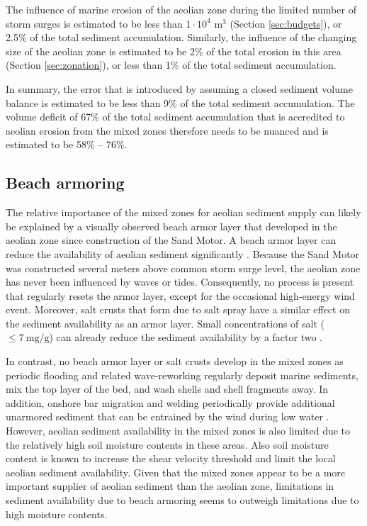 The influence of marine erosion of the aeolian zone during the limited
number of storm surges is estimated to be less than
$\mathrm{1 \cdot 10^4}$ $\mathrm{m^3}$ (Section \ref{sec:budgets}), or
2.5\% of the total sediment accumulation. Similarly, the influence of
the changing size of the aeolian zone is estimated to be 2\% of the
total erosion in this area (Section \ref{sec:zonation}), or less than
1\% of the total sediment accumulation.

In summary, the error that is introduced by assuming a closed sediment
volume balance is estimated to be less than 9\% of the total sediment
accumulation. The volume deficit of 67\% of the total sediment
accumulation that is accredited to aeolian erosion from the mixed
zones therefore needs to be nuanced and is estimated to be 58\% --
76\%.

\subsection{Beach armoring}

The relative importance of the mixed zones for aeolian sediment supply
can likely be explained by a visually observed beach armor layer that
developed in the aeolian zone since construction of the Sand Motor. A
beach armor layer can reduce the availability of aeolian sediment
significantly \citep{McKennaNeuman2012}. Because the Sand Motor was
constructed several meters above common storm surge level, the aeolian
zone has never been influenced by waves or tides. Consequently, no
process is present that regularly resets the armor layer, except for
the occasional high-energy wind event. Moreover, salt crusts that form
due to salt spray have a similar effect on the sediment availability
as an armor layer. Small concentrations of salt
($\mathrm{\leq 7 ~ mg/g}$) can already reduce the sediment
availability by a factor two \citep{Nickling1981}. 

In contrast, no beach armor layer or salt crusts develop in the mixed
zones as periodic flooding and related wave-reworking regularly
deposit marine sediments, mix the top layer of the bed, and wash
shells and shell fragments away. In addition, onshore bar migration
and welding periodically provide additional unarmored sediment that
can be entrained by the wind during low water \citep{Houser2009,
  Anthony2013}. However, aeolian sediment availability in the mixed
zones is also limited due to the relatively high soil moisture
contents in these areas. Also soil moisture content is known to
increase the shear velocity threshold \citep{Wiggs2004, Edwards2009,
  Namikas2010} and limit the local aeolian sediment availability.
Given that the mixed zones appear to be a more important supplier of
aeolian sediment than the aeolian zone, limitations in sediment
availability due to beach armoring seems to outweigh limitations due
to high moisture contents.

